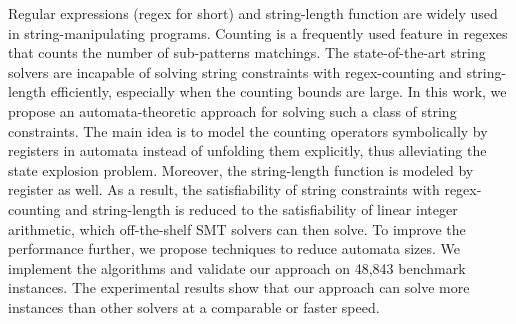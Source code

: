 
%

Regular expressions (regex for short) and string-length function are widely used in string-manipulating programs. 
Counting is a frequently used feature in regexes that counts the number of sub-patterns matchings. The state-of-the-art string solvers are incapable of solving string constraints with regex-counting and string-length efficiently, especially when the counting bounds are large. In this work, we propose an automata-theoretic approach for solving such a class of string constraints. 
%
The main idea is to model the counting operators symbolically by registers in automata instead of unfolding them explicitly, thus alleviating the state explosion problem.  
%
Moreover, the string-length function is modeled by register as well. 
As a result, the satisfiability of string constraints with regex-counting and string-length is reduced to the satisfiability of linear integer arithmetic, which off-the-shelf SMT solvers can then solve. 
%
%
To improve the performance further, we propose techniques to reduce automata sizes.
We implement the algorithms and validate our approach on 48,843 benchmark instances. The experimental results show that 
our approach can solve more instances than other solvers at a comparable or faster speed.



%